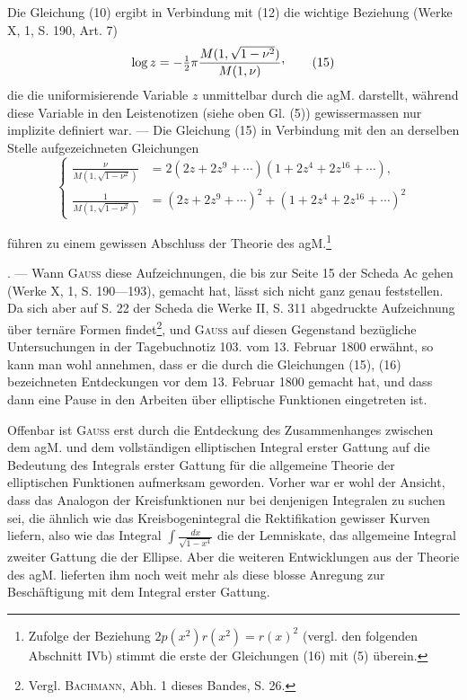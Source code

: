 Die Gleichung (10) ergibt in Verbindung mit (12) die wichtige Beziehung
(Werke X, 1, S. 190, Art. 7)
\begin{equation*}
\log z=-\tfrac12\pi\frac{M(1,\sqrt{1-\nu^2})}{M(1,\nu)}\mathpunct{\vcenter{\hbox{,}}}\tag*{(15)}
\end{equation*}
\noindent die die uniformisierende Variable \(z\) unmittelbar durch die agM. darstellt,
während diese Variable in den Leistenotizen (siehe oben Gl. (5)) gewissermassen
nur implizite definiert war. — Die Gleichung (15) in Verbindung mit
den an derselben Stelle aufgezeichneten Gleichungen
\begin{equation*}
\left\{\begin{aligned}
\frac\nu{M(1,\sqrt{1-\nu^2})}&=2(2z+2z^9+\cdots)(1+2z^4+2z^{16}+\cdots),\\
\frac1{M(1,\sqrt{1-\nu^2})}&=(2z+2z^9+\cdots)^2+(1+2z^4+2z^{16}+\cdots)^2
\end{aligned}\right.\tag*{(16)}
\end{equation*}
\endgroup\par
\clearpage{}
\noindent führen zu einem gewissen Abschluss der Theorie des agM.\begingroup\renewcommand{\thefootnote}{90a)}\footnote{Zufolge der Beziehung \(2p(x^2)r(x^2)=r(x)^2\) (vergl. den folgenden Abschnitt IVb) stimmt die erste der Gleichungen (16) mit (5) überein.}\endgroup\addtocounter{footnote}{-1}.
— Wann \textsc{Gauss}
diese Aufzeichnungen, die bis zur Seite 15 der Scheda Ac gehen (Werke X, 1,
S. 190—193), gemacht hat, lässt sich nicht ganz genau feststellen. Da sich aber
auf S. 22 der Scheda die Werke II, S. 311 abgedruckte Aufzeichnung über
ternäre Formen findet\footnote{Vergl. \textsc{Bachmann}, Abh. 1 dieses Bandes, S. 26.}, und \textsc{Gauss} auf diesen Gegenstand bezügliche Untersuchungen
in der Tagebuchnotiz 103. vom 13. Februar 1800 erwähnt, so kann
man wohl annehmen, dass er die durch die Gleichungen (15), (16) bezeichneten
Entdeckungen vor dem 13. Februar 1800 gemacht hat, und dass dann
eine Pause in den Arbeiten über elliptische Funktionen eingetreten ist.

Offenbar ist \textsc{Gauss} erst durch die Entdeckung des Zusammenhanges zwischen
dem agM. und dem vollständigen elliptischen Integral erster Gattung
auf die Bedeutung des Integrals erster Gattung für die allgemeine Theorie
der elliptischen Funktionen aufmerksam geworden. Vorher war er wohl der
Ansicht, dass das Analogon der Kreisfunktionen nur bei denjenigen Integralen
zu suchen sei, die ähnlich wie das Kreisbogenintegral die Rektifikation
gewisser Kurven liefern, also wie das Integral \(\displaystyle\int\frac{dx}{\sqrt{1-x^4}}\) die der Lemniskate, das
allgemeine Integral zweiter Gattung die der Ellipse. Aber die weiteren Entwicklungen
aus der Theorie des agM. lieferten ihm noch weit mehr als diese
blosse Anregung zur Beschäftigung mit dem Integral erster Gattung.

